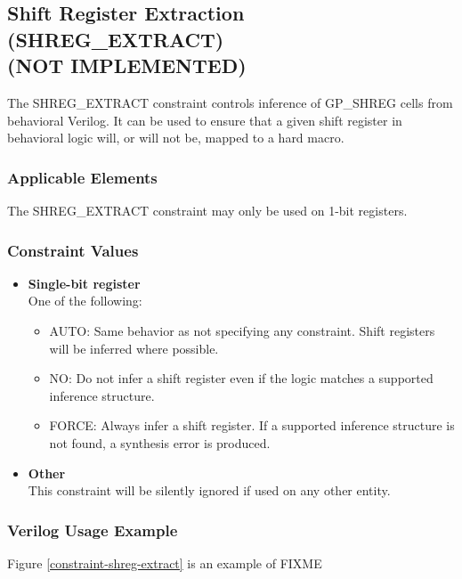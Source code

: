 \documentclass[11pt]{article}
\begin{document}

\pagebreak
\subsection{Shift Register Extraction (SHREG\_EXTRACT) \\ (NOT IMPLEMENTED)}
\label{shreg-extract}

The SHREG\_EXTRACT constraint controls inference of GP\_SHREG cells from behavioral Verilog. It can be 
used to ensure that a given shift register in behavioral logic will, or will not be, mapped to a hard macro.

\subsubsection{Applicable Elements}
The SHREG\_EXTRACT constraint may only be used on 1-bit registers.

\subsubsection{Constraint Values}
\begin{itemize}
\item {\bfseries Single-bit register}\\
One of the following:
\begin{itemize}
\item AUTO: Same behavior as not specifying any constraint. Shift registers will be inferred where possible.
\item NO: Do not infer a shift register even if the logic matches a supported inference structure.
\item FORCE: Always infer a shift register. If a supported inference structure is not found, a synthesis error is produced.
\end{itemize}
\item {\bfseries Other} \\
This constraint will be silently ignored if used on any other entity.
\end{itemize}

\clearpage
\subsubsection{Verilog Usage Example}

Figure \ref{constraint-shreg-extract} is an example of FIXME
\end{document}
